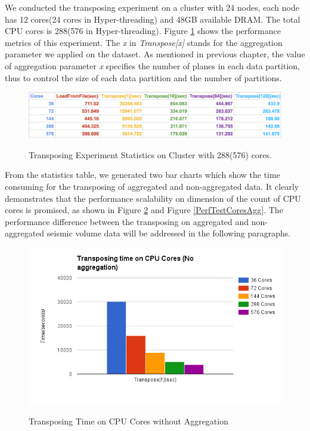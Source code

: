 We conducted the transposing experiment on a cluster with 24 nodes, each node has 12 cores(24 cores in Hyper-threading) and 48GB available DRAM. The total CPU cores is 288(576 in Hyper-threading). Figure \ref{TestStat} shows the performance metrics of this experiment. The \emph{x} in \emph{Transpose[x]} stands for the aggregation parameter we applied on the dataset. As mentioned in previous chapter, the value of aggregation parameter \emph{x} specifies the number of planes in each data partition, thus to control the size of each data partition and the number of partitions. 

\begin{figure}[h]
\centering
\includegraphics[scale=0.6]{figures/TestStat.png}\\
\caption{Transposing Experiment Statistics on Cluster with 288(576) cores.}\label{TestStat}
\end{figure}

From the statistics table, we generated two bar charts which show the time consuming for the transposing of aggregated and non-aggregated data. It clearly demonstrates that the performance scalability on dimension of the count of CPU cores is promised, as shown in Figure \ref{PerfTestCoresNoAgg} and  Figure \ref{PerfTestCoresAgg}. The performance difference between the transposing on aggregated and non-aggregated seismic volume data will be addressed in the following paragraphs.

\begin{figure}[ht]
\centering
\includegraphics[scale=0.7]{figures/PerfTestCoresNoAgg.png}\\
\caption{Transposing Time on CPU Cores without Aggregation}\label{PerfTestCoresNoAgg}
\end{figure}

